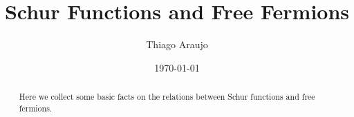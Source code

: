 \title[Schur Functions and Free Fermions]{Schur Functions and Free Fermions}

\author{Thiago Araujo}

\address{\noindent 
Instituto de Fíısica Teórica, UNESP-Universidade Estadual Paulista
R. Dr. Bento T. Ferraz 271, Bl. II, Sao Paulo 01140-070, SP, Brazil\\
and
Instituto de Física\\
Universidade de S\~ao Paulo\\ 
Rua do Matão Travessa 1371, 05508-090\\
São Paulo, SP. Brazil
}


\date{\today}

\begin{abstract}
  Here we collect some basic facts on the relations between Schur functions
  and free fermions.
\end{abstract}

\maketitle

\setcounter{tocdepth}{1}
\tableofcontents
